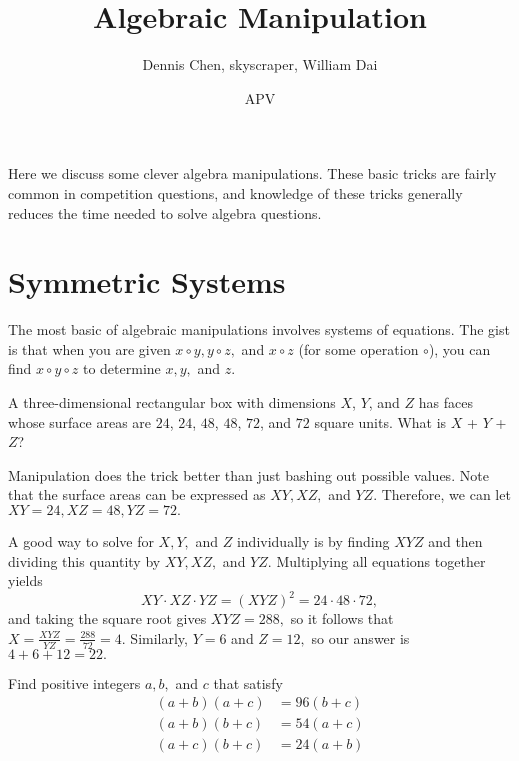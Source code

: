 \documentclass{article}
\title{Algebraic Manipulation}
\author{Dennis Chen, skyscraper, William Dai}
\date{APV}
\begin{document}
\maketitle

Here we discuss some clever algebra manipulations. These basic tricks are fairly common in competition questions, and knowledge of these tricks generally reduces the time needed to solve algebra questions.

\section{Symmetric Systems}

The most basic of algebraic manipulations involves systems of equations. The gist is that when you are given $x\circ y,y\circ z,$ and $x\circ z$ (for some operation $\circ$), you can find $x \circ y \circ z$ to determine $x,y,$ and $z.$
\begin{exam}[2018 AMC 10B/4]
A three-dimensional rectangular box with dimensions $X$, $Y$, and $Z$ has faces whose surface areas are $24$, $24$, $48$, $48$, $72$, and $72$ square units. What is $X$ + $Y$ + $Z$?
\end{exam}
\begin{sol}
Manipulation does the trick better than just bashing out possible values. Note that the surface areas can be expressed as $XY,XZ,$ and $YZ.$ Therefore, we can let $XY = 24, XZ = 48, YZ = 72.$

A good way to solve for $X,Y,$ and $Z$ individually is by finding $XYZ$ and then dividing this quantity by $XY, XZ,$ and $YZ.$ Multiplying all equations together yields
\[XY \cdot XZ \cdot YZ = (XYZ)^2 = 24 \cdot 48 \cdot 72,\]
and taking the square root gives $XYZ = 288,$ so it follows that $X = \frac{XYZ}{YZ} = \frac{288}{72} = 4.$ Similarly, $Y = 6$ and $Z=12,$ so our answer is $4+6+12= 22.$
\end{sol}
\begin{exam}[Classic]
Find positive integers $a,b,$ and $c$ that satisfy
\begin{align*}
(a+b)(a+c)&=96(b+c) \\
(a+b)(b+c)&=54(a+c) \\
(a+c)(b+c)&=24(a+b)
\end{align*}
\end{exam}
\end{document}
